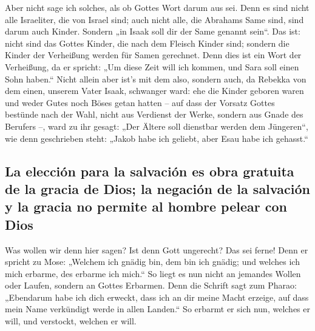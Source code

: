  Aber nicht sage ich solches, als ob Gottes Wort darum aus
sei. Denn es sind nicht alle Israeliter, die von Israel sind;
 auch nicht alle, die Abrahams Same sind, sind darum auch
Kinder. Sondern „in Isaak soll dir der Same genannt sein``.
 Das ist: nicht sind das Gottes Kinder, die nach dem
Fleisch Kinder sind; sondern die Kinder der Verheißung werden für Samen
gerechnet.  Denn dies ist ein Wort der Verheißung, da er
spricht: „Um diese Zeit will ich kommen, und Sara soll einen Sohn
haben.``  Nicht allein aber ist's mit dem also, sondern
auch, da Rebekka von dem einen, unserem Vater Isaak, schwanger ward:
 ehe die Kinder geboren waren und weder Gutes noch Böses
getan hatten -- auf dass der Vorsatz Gottes bestünde nach der Wahl,
 nicht aus Verdienst der Werke, sondern aus Gnade des
Berufers --, ward zu ihr gesagt: „Der Ältere soll dienstbar werden dem
Jüngeren``,  wie denn geschrieben steht: „Jakob habe ich
geliebt, aber Esau habe ich gehasst.``

\hypertarget{la-elecciuxf3n-para-la-salvaciuxf3n-es-obra-gratuita-de-la-gracia-de-dios-la-negaciuxf3n-de-la-salvaciuxf3n-y-la-gracia-no-permite-al-hombre-pelear-con-dios}{%
\subsection{La elección para la salvación es obra gratuita de la gracia
de Dios; la negación de la salvación y la gracia no permite al hombre
pelear con
Dios}\label{la-elecciuxf3n-para-la-salvaciuxf3n-es-obra-gratuita-de-la-gracia-de-dios-la-negaciuxf3n-de-la-salvaciuxf3n-y-la-gracia-no-permite-al-hombre-pelear-con-dios}}

 Was wollen wir denn hier sagen? Ist denn Gott ungerecht?
Das sei ferne!  Denn er spricht zu Mose: „Welchem ich
gnädig bin, dem bin ich gnädig; und welches ich mich erbarme, des
erbarme ich mich.``  So liegt es nun nicht an jemandes
Wollen oder Laufen, sondern an Gottes Erbarmen.  Denn die
Schrift sagt zum Pharao: „Ebendarum habe ich dich erweckt, dass ich an
dir meine Macht erzeige, auf dass mein Name verkündigt werde in allen
Landen.``  So erbarmt er sich nun, welches er will, und
verstockt, welchen er will.

